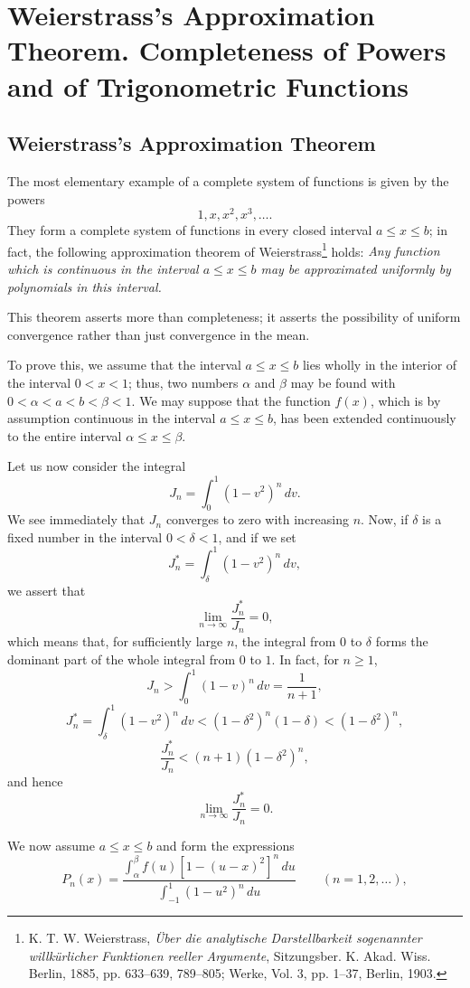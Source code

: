 \section{Weierstrass's Approximation Theorem. Completeness of Powers and of Trigonometric Functions}
\subsection{Weierstrass's Approximation Theorem}
The most elementary example of a complete system of functions is given by the powers
\[
1,x,x^2,x^3,\ldots.
\]
They form a complete system of functions in every closed interval $a\le x\le b$; in fact, the following approximation theorem of Weierstrass\footnote{K. T. W. Weierstrass, \emph{Über die analytische Darstellbarkeit sogenannter willkürlicher Funktionen reeller Argumente}, Sitzungsber. K. Akad. Wiss. Berlin, 1885, pp. 633--639, 789--805; Werke, Vol. 3, pp. 1--37, Berlin, 1903.} holds: \emph{Any function which is continuous in the interval $a\le x\le b$ may be approximated uniformly by polynomials in this interval.}

This theorem asserts more than completeness; it asserts the possibility of uniform convergence rather than just convergence in the mean.

To prove this, we assume that the interval $a\le x\le b$ lies wholly in the interior of the interval $0<x<1$; thus, two numbers $\alpha$ and $\beta$ may be found with $0<\alpha<a<b<\beta<1$. We may suppose that the function $f(x)$, which is by assumption continuous in the interval $a\le x\le b$, has been extended continuously to the entire interval $\alpha\le x\le\beta$.

Let us now consider the integral
\[
J_n=\int_0^1(1-v^2)^n\,dv.
\]
We see immediately that $J_n$ converges to zero with increasing $n$. Now, if $\delta$ is a fixed number in the interval $0<\delta<1$, and if we set
\[
J_n^*=\int_\delta^1(1-v^2)^n\,dv,
\]
we assert that
\[
\lim_{n\to\infty}\frac{J_n^*}{J_n}=0,
\]
which means that, for sufficiently large $n$, the integral from $0$ to $\delta$ forms the dominant part of the whole integral from $0$ to $1$. In fact, for $n\ge1$,
\[
J_n>\int_0^1(1-v)^n\,dv=\frac1{n+1},
\]
\[
J_n^*=\int_\delta^1(1-v^2)^n\,dv<(1-\delta^2)^n(1-\delta)<(1-\delta^2)^n,
\]
\[
\frac{J_n^*}{J_n}<(n+1)(1-\delta^2)^n,
\]
and hence
\[
\lim_{n\to\infty}\frac{J_n^*}{J_n}=0.
\]

We now assume $a\le x\le b$ and form the expressions
\[
P_n(x)=\frac{\displaystyle\int_\alpha^\beta f(u)[1-(u-x)^2]^n\,du}{\displaystyle\int_{-1}^{1}(1-u^2)^n\,du}
\qquad(n=1,2,\ldots),
\]

